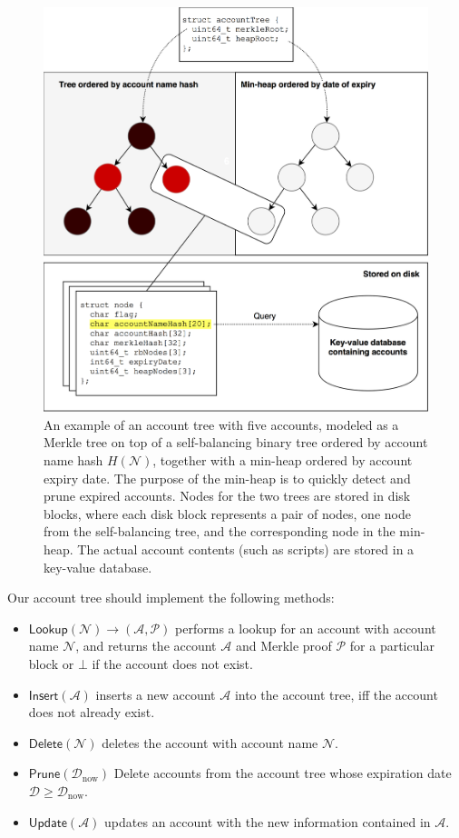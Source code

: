 \documentclass{style/kththesis}
\begin{document}
\begin{figure}
    \centering
    \includegraphics[width=\textwidth]{figures/account-tree}
    \caption{An example of an account tree with five accounts, modeled as a Merkle tree on top of a self-balancing binary tree ordered by account name hash $H(\mathcal{N})$, together with a min-heap ordered by account expiry date. The purpose of the min-heap is to quickly detect and prune expired accounts. Nodes for the two trees are stored in disk blocks, where each disk block represents a pair of nodes, one node from the self-balancing tree, and the corresponding node in the min-heap. The actual account contents (such as scripts) are stored in a key-value database.}
    \label{fig:account-tree}
\end{figure}

Our account tree should implement the following methods:

\begin{itemize}
    \item $\mathsf{Lookup}(\mathcal{N}) \rightarrow (\mathcal{A}, \mathcal{P})$ performs a lookup for an account with account name $\mathcal{N}$, and returns the account $\mathcal{A}$ and Merkle proof $\mathcal{P}$ for a particular block or $\bot$ if the account does not exist.
    \item $\mathsf{Insert}(\mathcal{A})$ inserts a new account $\mathcal{A}$ into the account tree, iff the account does not already exist.
    \item $\mathsf{Delete}(\mathcal{N})$ deletes the account with account name $\mathcal{N}$.
    \item $\mathsf{Prune}(\mathcal{D}_{\text{now}})$ Delete accounts from the account tree whose expiration date $\mathcal{D} \ge \mathcal{D}_\text{now}$.
    \item $\mathsf{Update}(\mathcal{A})$ updates an account with the new information contained in $\mathcal{A}$.
\end{itemize}
\end{document}
